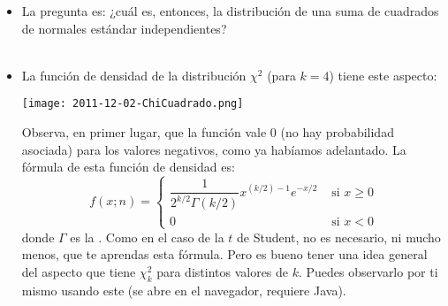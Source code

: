 \begin{itemize}
    \item La pregunta es: ¿cuál es, entonces, la distribución de una suma de cuadrados de normales estándar independientes?\\[3mm]
       \\[3mm]

    \item La función de densidad de la distribución $\chi^2$ (para $k=4$) tiene este aspecto:
         \begin{center}
         \texttt{[image: 2011-12-02-ChiCuadrado.png]}
         \end{center}
         Observa, en primer lugar, que la función vale $0$ (no hay probabilidad asociada) para los valores negativos, como ya habíamos adelantado. La fórmula de esta función de densidad es:
         \[f(x;n)=
         \begin{cases}
         \dfrac{1}{2^{k/2}\Gamma(k/2)}x^{(k/2)-1}e^{-x/2}&\mbox{ si }x\geq 0\\
         0&\mbox{ si }x<0
         \end{cases}
         \]
         donde $\Gamma$ es la . Como en el caso de la $t$ de Student, no es necesario, ni mucho menos, que te aprendas esta fórmula. Pero es bueno tener una idea general del aspecto que tiene $\chi^2_k$ para distintos valores de $k$. Puedes observarlo por ti mismo usando este  (se abre en el navegador, requiere Java).


\end{itemize}
